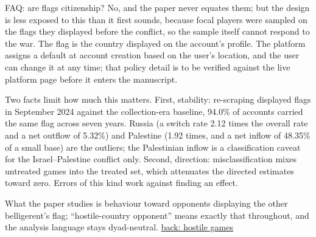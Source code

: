 \documentclass[aspectratio=169,11pt,t]{beamer}
\newcommand{\backto}[2]{\vfill\hfill\hyperlink{#1}{\textcolor{linkblue}{\scriptsize\textsf{back: #2}}}}
\begin{document}
\begin{frame}[label=faq-flags]{FAQ: are flags citizenship?}
  \footnotesize
  No, and the paper never equates them; but the design is less exposed to this than it first sounds, because focal players were sampled on the flags they displayed before the conflict, so the sample itself cannot respond to the war. The flag is the country displayed on the account's profile. The platform assigns a default at account creation based on the user's location, and the user can change it at any time; that policy detail is to be verified against the live platform page before it enters the manuscript.

  Two facts limit how much this matters. First, stability: re-scraping displayed flags in September 2024 against the collection-era baseline, 94.0\% of accounts carried the same flag across seven years. Russia (a switch rate 2.12 times the overall rate and a net outflow of 5.32\%) and Palestine (1.92 times, and a net inflow of 48.35\% of a small base) are the outliers; the Palestinian inflow is a classification caveat for the Israel--Palestine conflict only. Second, direction: misclassification mixes untreated games into the treated set, which attenuates the directed estimates toward zero. Errors of this kind work against finding an effect.

  What the paper studies is behaviour toward opponents displaying the other belligerent's flag; ``hostile-country opponent'' means exactly that throughout, and the analysis language stays dyad-neutral.
  \backto{bk-hostile}{hostile games}
\end{frame}
\end{document}
